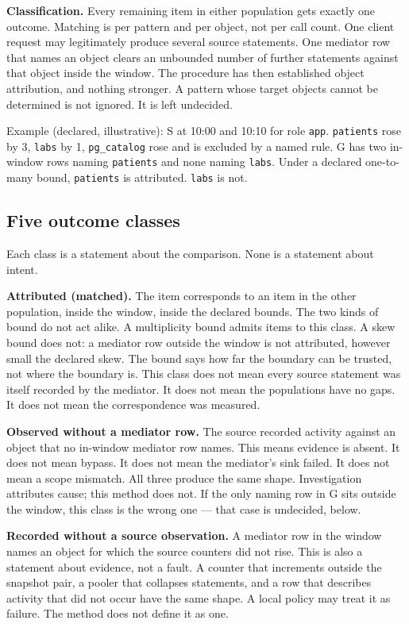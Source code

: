 \documentclass[11pt]{article}
\begin{document}
\textbf{Classification.} Every remaining item in either population gets exactly one outcome. Matching is per pattern and per object, not per call count. One client request may legitimately produce several source statements. One mediator row that names an object clears an unbounded number of further statements against that object inside the window. The procedure has then established object attribution, and nothing stronger. A pattern whose target objects cannot be determined is not ignored. It is left undecided.

Example (declared, illustrative): S at 10:00 and 10:10 for role \texttt{app}. \texttt{patients} rose by 3, \texttt{labs} by 1, \texttt{pg\_catalog} rose and is excluded by a named rule. G has two in-window rows naming \texttt{patients} and none naming \texttt{labs}. Under a declared one-to-many bound, \texttt{patients} is attributed. \texttt{labs} is not.

\subsection{Five outcome classes}

Each class is a statement about the comparison. None is a statement about intent.

\textbf{Attributed (matched).} The item corresponds to an item in the other population, inside the window, inside the declared bounds. The two kinds of bound do not act alike. A multiplicity bound admits items to this class. A skew bound does not: a mediator row outside the window is not attributed, however small the declared skew. The bound says how far the boundary can be trusted, not where the boundary is. This class does not mean every source statement was itself recorded by the mediator. It does not mean the populations have no gaps. It does not mean the correspondence was measured.

\textbf{Observed without a mediator row.} The source recorded activity against an object that no in-window mediator row names. This means evidence is absent. It does not mean bypass. It does not mean the mediator's sink failed. It does not mean a scope mismatch. All three produce the same shape. Investigation attributes cause; this method does not. If the only naming row in G sits outside the window, this class is the wrong one --- that case is undecided, below.

\textbf{Recorded without a source observation.} A mediator row in the window names an object for which the source counters did not rise. This is also a statement about evidence, not a fault. A counter that increments outside the snapshot pair, a pooler that collapses statements, and a row that describes activity that did not occur have the same shape. A local policy may treat it as failure. The method does not define it as one.
\end{document}
